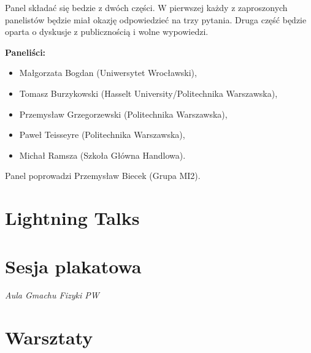 \documentclass[11pt,twoside,b5paper]{book}
\begin{document}
Panel składać się bedzie z dwóch części. W pierwszej każdy z zaproszonych panelistów będzie miał okazję odpowiedzieć na trzy pytania. Druga część będzie oparta o dyskusje z publicznością i wolne wypowiedzi.

\textbf{Paneliści:}\\ 
\begin{itemize}
\item Małgorzata Bogdan (Uniwersytet Wrocławski),
\item Tomasz Burzykowski (Hasselt University/Politechnika Warszawska),
\item Przemysław Grzegorzewski (Politechnika Warszawska),
\item Paweł Teisseyre (Politechnika Warszawska),
\item Michał Ramsza (Szkoła Główna Handlowa). 
\end{itemize}
Panel poprowadzi Przemysław Biecek (Grupa MI2).

\newpage
\chapter{Lightning Talks}\newpage




\newpage

\newpage
\chapter{Sesja plakatowa}{\LARGE \textit{Aula Gmachu Fizyki PW}}
\newpage

\newpage


\newpage
\chapter{Warsztaty}{}\newpage

\newpage

\newpage

\newpage

\newpage

\newpage

\newpage

\newpage

\newpage

\newpage

\newpage

\newpage

\newpage

\newpage

\newpage

\newpage

\newpage

\newpage

\end{document}
